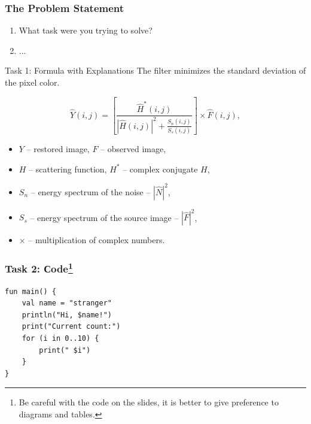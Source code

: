 \documentclass[12pt,aspectratio=169,hyperref={pdftex,unicode},xcolor=dvipsnames]{beamer}
\begin{document}
    \begin{frame}
        \frametitle{The Problem Statement}
        \begin{enumerate}
            \item What task were you trying to solve?
            \item ...
        \end{enumerate}
    \end{frame}

    \begin{frame}{Task 1: Formula with Explanations}
        The filter minimizes the standard deviation of the pixel color.

        \begin{equation*}\label{eq:wiener_nsr}
        \hat{Y}(i, j) = \left[ \frac{\hat{H}^*(i, j)}{\left|\hat{H}(i, j)\right|^2 + \frac{S_n(i, j)}{S_s(i, j)}} \right] \times \hat{F}(i, j),
        \end{equation*}
        \begin{itemize}
            \item $Y$ -- restored image,  $F$ -- observed image,
            \item $H$ -- scattering function, $H^*$ -- complex conjugate $H$,
            \item $S_n$ -- energy spectrum of the noise -- $\left| \hat{N} \right|^2$,
            \item $S_s$ -- energy spectrum of the source image -- $\left| \hat{F} \right|^2$,
            \item $\times$ -- multiplication of complex numbers.
        \end{itemize}
    \end{frame}

    \begin{frame}[fragile]
        \frametitle{Task 2: Сode\footnote{Be careful with the code on the slides, it is better to give preference to diagrams and tables.}}
        \begin{verbatim}
fun main() {
    val name = "stranger"
    println("Hi, $name!")
    print("Current count:")
    for (i in 0..10) {
        print(" $i")
    }
}
        \end{verbatim}
    \end{frame}
\end{document}
